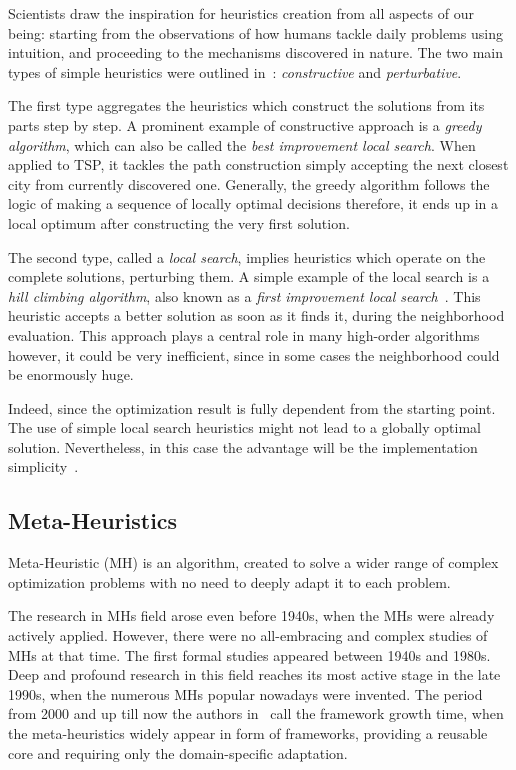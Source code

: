 Scientists draw the inspiration for heuristics creation from all aspects of our being: starting from the observations of how humans tackle daily problems using intuition, and proceeding to the mechanisms discovered in nature. The two main types of simple heuristics were outlined in~\cite{burke2019classification}: \textit{constructive} and \textit{perturbative}. 

The first type aggregates the heuristics which construct the solutions from its parts step by step. 
A prominent example of constructive approach is a \textit{greedy algorithm}, which can also be called the \textit{best improvement local search}. When applied to TSP, it tackles the path construction simply accepting the next closest city from currently discovered one. Generally, the greedy algorithm follows the logic of making a sequence of locally optimal decisions therefore, it ends up in a local optimum after constructing the very first solution. 

The second type, called a \textit{local search}, implies heuristics which operate on the complete solutions, perturbing them. A simple example of the local search is a \textit{hill climbing algorithm}, also known as a \textit{first improvement local search}~\cite{voudouris1999guided}. This heuristic accepts a better solution as soon as it finds it, during the neighborhood evaluation. This approach plays a central role in many high-order algorithms however, it could be very inefficient, since in some cases the neighborhood could be enormously huge. 

Indeed, since the optimization result is fully dependent from the starting point. The use of simple local search heuristics might not lead to a globally optimal solution. Nevertheless, in this case the advantage will be the implementation simplicity~\cite{williamson2011design}.

 
\subsection{Meta-Heuristics}\label{bg: mh}
Meta-Heuristic (MH) is an algorithm, created to solve a wider range of complex optimization problems with no need to deeply adapt it to each problem.

The research in MHs field arose even before 1940s, when the MHs were already actively applied. However, there were no all-embracing and complex studies of MHs at that time. The first formal studies appeared between 1940s and 1980s. Deep and profound research in this field reaches its most active stage in the late 1990s, when the numerous MHs popular nowadays were invented. The period from 2000 and up till now the authors in~\cite{sorensen2017history} call the framework growth time, when the meta-heuristics widely appear in form of frameworks, providing a reusable core and requiring only the domain-specific adaptation.

